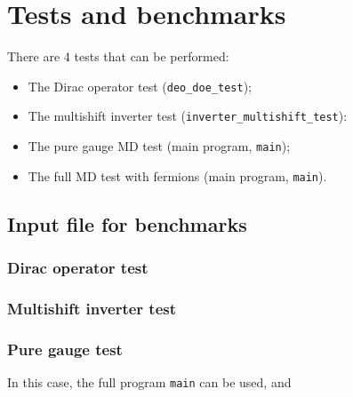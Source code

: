 
\chapter{Tests and benchmarks}

There are 4 tests that can be performed:
\begin{itemize}
 \item The Dirac operator test (\verb|deo_doe_test|);
 \item The multishift inverter test (\verb|inverter_multishift_test|):
 \item The pure gauge MD test (main program, \verb|main|);
 \item The full MD test with fermions (main program, \verb|main|).
\end{itemize}




\section{Input file for benchmarks}


\subsection{Dirac operator test}


\subsection{Multishift inverter test}


\subsection{Pure gauge test}

In this case, the full program \verb|main| can be used, and 

